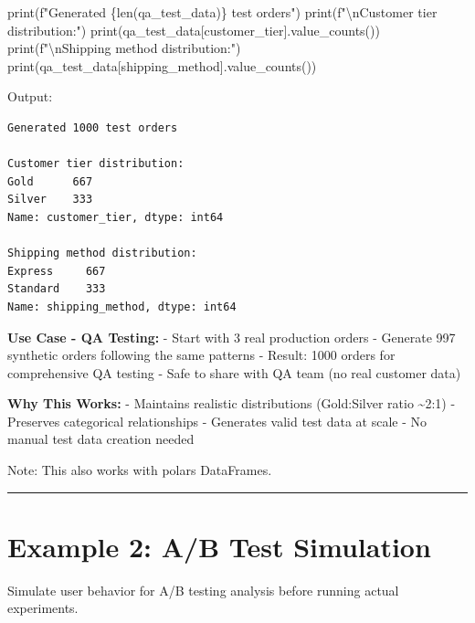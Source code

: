 \documentclass[
  letterpaper,
]{scrbook}
\newenvironment{Shaded}{\begin{snugshade}}{\end{snugshade}}
\newcommand{\BuiltInTok}[1]{\textcolor[rgb]{0.00,0.23,0.31}{#1}}
\newcommand{\CharTok}[1]{\textcolor[rgb]{0.13,0.47,0.30}{#1}}
\newcommand{\NormalTok}[1]{\textcolor[rgb]{0.00,0.23,0.31}{#1}}
\newcommand{\SpecialCharTok}[1]{\textcolor[rgb]{0.37,0.37,0.37}{#1}}
\newcommand{\SpecialStringTok}[1]{\textcolor[rgb]{0.13,0.47,0.30}{#1}}
\newcommand{\StringTok}[1]{\textcolor[rgb]{0.13,0.47,0.30}{#1}}
\begin{document}
\begin{Shaded}
\begin{Highlighting}[]
\BuiltInTok{print}\NormalTok{(}\SpecialStringTok{f"Generated }\SpecialCharTok{\{}\BuiltInTok{len}\NormalTok{(qa\_test\_data)}\SpecialCharTok{\}}\SpecialStringTok{ test orders"}\NormalTok{)}
\BuiltInTok{print}\NormalTok{(}\SpecialStringTok{f"}\CharTok{\textbackslash{}n}\SpecialStringTok{Customer tier distribution:"}\NormalTok{)}
\BuiltInTok{print}\NormalTok{(qa\_test\_data[}\StringTok{\textquotesingle{}customer\_tier\textquotesingle{}}\NormalTok{].value\_counts())}
\BuiltInTok{print}\NormalTok{(}\SpecialStringTok{f"}\CharTok{\textbackslash{}n}\SpecialStringTok{Shipping method distribution:"}\NormalTok{)}
\BuiltInTok{print}\NormalTok{(qa\_test\_data[}\StringTok{\textquotesingle{}shipping\_method\textquotesingle{}}\NormalTok{].value\_counts())}
\end{Highlighting}
\end{Shaded}

Output:

\begin{verbatim}
Generated 1000 test orders

Customer tier distribution:
Gold      667
Silver    333
Name: customer_tier, dtype: int64

Shipping method distribution:
Express     667
Standard    333
Name: shipping_method, dtype: int64
\end{verbatim}

\textbf{Use Case - QA Testing:} - Start with 3 real production orders -
Generate 997 synthetic orders following the same patterns - Result: 1000
orders for comprehensive QA testing - Safe to share with QA team (no
real customer data)

\textbf{Why This Works:} - Maintains realistic distributions
(Gold:Silver ratio \textasciitilde2:1) - Preserves categorical
relationships - Generates valid test data at scale - No manual test data
creation needed

Note: This also works with polars DataFrames.

\begin{center}\rule{0.5\linewidth}{0.5pt}\end{center}

\section{Example 2: A/B Test
Simulation}\label{example-2-ab-test-simulation}

Simulate user behavior for A/B testing analysis before running actual
experiments.
\end{document}
